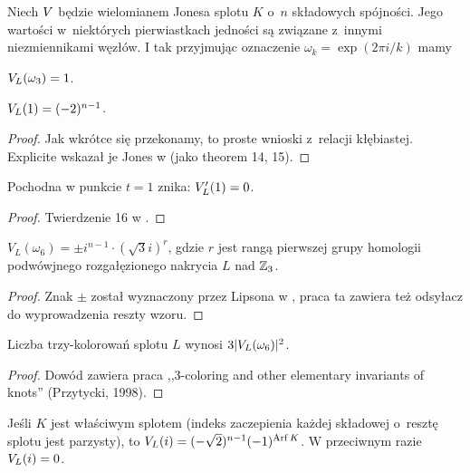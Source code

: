Niech $V$ będzie wielomianem Jonesa splotu $K$ o~$n$ składowych spójności.
Jego wartości w~niektórych pierwiastkach jedności są związane z~innymi niezmiennikami węzłów.
I tak przyjmując oznaczenie $\omega_k = \exp(2\pi i/k)$ mamy

\begin{proposition}
    \label{prp:jones_at_roots_of_unity}
    $V_L(\omega_3) = 1$.
\end{proposition}

\begin{proposition}
    $V_L(1) = (-2)^{n-1}$.
\end{proposition}

\begin{proof}
    Jak wkrótce się przekonamy, to proste wnioski z~relacji kłębiastej.
    Explicite wskazał je Jones w \cite{jones85} (jako theorem 14, 15).
\end{proof}

\begin{proposition}
    Pochodna w punkcie $t = 1$ znika: $V'_L(1) = 0$.
\end{proposition}

\begin{proof}
    Twierdzenie 16 w \cite{jones85}.
\end{proof}

\begin{proposition}
    $V_L(\omega_6) = \pm i^{n-1} \cdot (\sqrt 3i)^r$, gdzie $r$ jest rangą pierwszej grupy homologii podwówjnego rozgałęzionego nakrycia $L$ nad $\mathbb Z_3$.
\end{proposition}

\begin{proof}
    Znak $\pm$ został wyznaczony przez Lipsona w \cite{lipson86}, praca ta zawiera też odsyłacz do wyprowadzenia reszty wzoru.
\end{proof}

\begin{proposition}
    Liczba trzy-kolorowań splotu $L$ wynosi $3|V_L(\omega_6)|^2$.
\end{proposition}

\begin{proof}
    Dowód zawiera praca ,,3-coloring and other elementary invariants of knots'' (Przytycki, 1998).
\end{proof}

\begin{proposition}
    Jeśli $K$ jest właściwym splotem (indeks zaczepienia każdej składowej o~resztę splotu jest parzysty), to $V_L(i) = (-\sqrt 2)^{n-1}(-1)^{\operatorname{Arf} K}$.
    W przeciwnym razie $V_L(i) = 0$.
\end{proposition}

